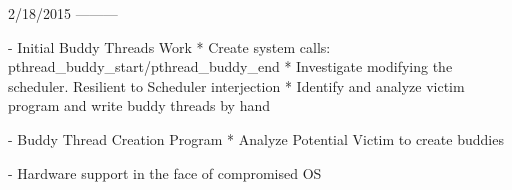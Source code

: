 2/18/2015
---------

- Initial Buddy Threads Work
	* Create system calls: pthread_buddy_start/pthread_buddy_end
	* Investigate modifying the scheduler. Resilient to Scheduler interjection
	* Identify and analyze victim program and write buddy threads by hand

- Buddy Thread Creation Program
	* Analyze Potential Victim to create buddies

- Hardware support in the face of compromised OS
